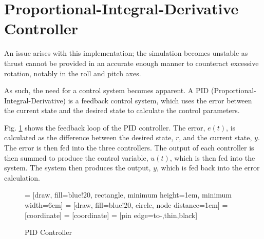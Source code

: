 \documentclass[../report.tex]{subfiles}
\begin{document}
\section{Proportional-Integral-Derivative Controller}

An issue arises with this implementation; the simulation becomes unstable as thrust cannot be provided in an accurate enough manner to counteract excessive rotation, notably in the roll and pitch axes. 

As such, the need for a control system becomes apparent. A PID (Proportional-Integral-Derivative) is a feedback control system, which uses the error between the current state and the desired state to calculate the control parameters.

Fig. \ref{fig:pid} shows the feedback loop of the PID controller. The error, $e(t)$, is calculated as the difference between the desired state, $r$, and the current state, $y$. The error is then fed into the three controllers. The output of each controller is then summed to produce the control variable, $u(t)$, which is then fed into the system. The system then produces the output, $y$, which is fed back into the error calculation.

\begin{figure}[H]
    \centering
     = [draw, fill=blue!20, rectangle, 
    minimum height=1em, minimum width=6em]
     = [draw, fill=blue!20, circle, node distance=1cm]
     = [coordinate]
     = [coordinate]
     = [pin edge={to-,thin,black}]

    \caption{PID Controller}
    \label{fig:pid}
\end{figure}
\end{document}
